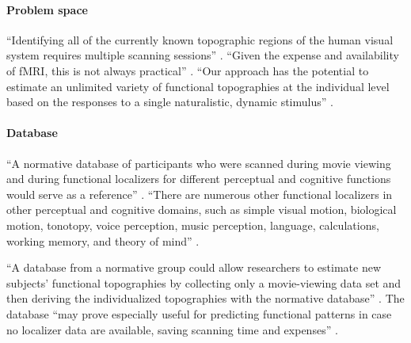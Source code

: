




\paragraph{Problem space}

%
``Identifying all of the currently known topographic regions of the human visual
system requires multiple scanning sessions'' \citep{wang2015probabilistic}.
%
``Given the expense and availability of fMRI, this is not always practical''
\citep{wang2015probabilistic}.
%
``Our approach has the potential to estimate an unlimited variety of functional
topographies at the individual level based on the responses to a single
naturalistic, dynamic stimulus'' \citep{jiahui2020predicting}.


\paragraph{Database}

%
``A normative database of participants who were scanned during movie viewing and
during functional localizers for different perceptual and cognitive functions
would serve as a reference'' \citep{jiahui2020predicting}.
%
``There are numerous other functional localizers in other perceptual and
cognitive domains, such as simple visual motion, biological motion, tonotopy,
voice perception, music perception, language, calculations, working memory, and
theory of mind'' \citep{jiahui2020predicting}.

%
``A database from a normative group could allow researchers to estimate new
subjects' functional topographies by collecting only a movie-viewing data set
and then deriving the individualized topographies with the normative database''
\citep{jiahui2020predicting}.
%
The database ``may prove especially useful for predicting functional patterns in
case no localizer data are available, saving scanning time and expenses''
\citep{rosenke2021probabilistic}.


